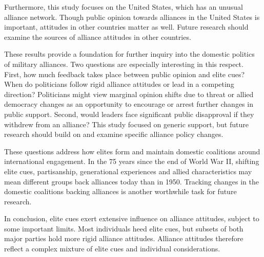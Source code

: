 \documentclass[12pt]{article}
\begin{document}
Furthermore, this study focuses on the United States, which has an unusual alliance network. 
Though public opinion towards alliances in the United States is important, attitudes in other countries matter as well. 
Future research should examine the sources of alliance attitudes in other countries. 


These results provide a foundation for further inquiry into the domestic politics of military alliances. 
Two questions are especially interesting in this respect.
First, how much feedback takes place between public opinion and elite cues? 
When do politicians follow rigid alliance attitudes or lead in a competing direction? 
Politicians might view marginal opinion shifts due to threat or allied democracy changes as an opportunity to encourage or arrest further changes in public support.
Second, would leaders face significant public disapproval if they withdrew from an alliance? 
This study focused on generic support, but future research should build on \citet{TomzWeeks2021} and examine specific alliance policy changes. 


These questions address how elites form and maintain domestic coalitions around international engagement. 
In the 75 years since the end of World War II, shifting elite cues, partisanship, generational experiences and allied characteristics may mean different groups back alliances today than in 1950. 
Tracking changes in the domestic coalitions backing alliances is another worthwhile task for future research.


In conclusion, elite cues exert extensive influence on alliance attitudes, subject to some important limits.
Most individuals heed elite cues, but subsets of both major parties hold more rigid alliance attitudes. 
Alliance attitudes therefore reflect a complex mixture of elite cues and individual considerations. 



\newpage

 
 
\end{document}
